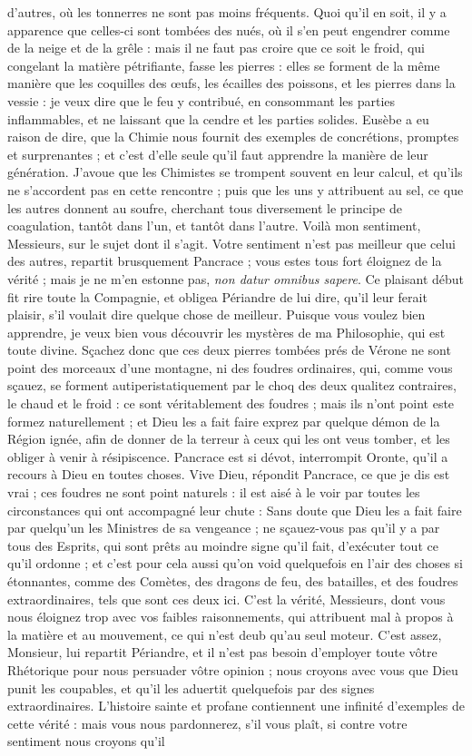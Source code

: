\documentclass[a4paper, 11pt, oneside, polutonikogreek, french, landscape, twocolumn]{article}
\begin{document}
d'autres, où les tonnerres ne sont pas moins fréquents. Quoi qu'il en soit, il y a apparence que celles-ci sont tombées des nués, où il s'en peut engendrer comme de la neige et de la grêle : mais il ne faut pas croire que ce soit le froid, qui congelant la matière pétrifiante, fasse les pierres : elles se forment de la même manière que les coquilles des œufs, les écailles des poissons, et les pierres dans la vessie : je veux dire que le feu y contribué, en consommant les parties inflammables, et ne laissant que la cendre et les parties solides. Eusèbe a eu raison de dire, que la Chimie nous fournit des exemples de concrétions, promptes et surprenantes ; et c'est d'elle seule qu'il faut apprendre la manière de leur génération. J'avoue que les Chimistes se trompent souvent en leur calcul, et qu'ils ne s'accordent pas en cette rencontre ; puis que les uns y attribuent au sel, ce que les autres donnent au soufre, cherchant tous diversement le principe de coagulation, tantôt dans l'un, et tantôt dans l'autre. Voilà mon sentiment, Messieurs, sur le sujet dont il s'agit. Votre sentiment n'est pas meilleur que celui des autres, repartit brusquement Pancrace ; vous estes tous fort éloignez de la vérité ; mais je ne m'en estonne pas, \emph{non datur omnibus sapere}. Ce plaisant début fit rire toute la Compagnie, et obligea Périandre de lui dire, qu'il leur ferait plaisir, s'il voulait dire quelque chose de meilleur. Puisque vous voulez bien apprendre, je veux bien vous découvrir les mystères de ma Philosophie, qui est toute divine. Sçachez donc que ces deux pierres tombées prés de Vérone ne sont point des morceaux d'une montagne, ni des foudres ordinaires, qui, comme vous sçauez, se forment autiperistatiquement par le choq des deux qualitez contraires, le chaud et le froid : ce sont véritablement des foudres ; mais ils n'ont point este formez naturellement ; et Dieu les a fait faire exprez par quelque démon de la Région ignée, afin de donner de la terreur à ceux qui les ont veus tomber, et les obliger à venir à résipiscence. Pancrace est si dévot, interrompit Oronte, qu'il a recours à Dieu en toutes choses. Vive Dieu, répondit Pancrace, ce que je dis est vrai ; ces foudres ne sont point naturels : il est aisé à le voir par toutes les circonstances qui ont accompagné leur chute : Sans doute que Dieu les a fait faire par quelqu'un les Ministres de sa vengeance ; ne sçauez-vous pas qu'il y a par tous des Esprits, qui sont prêts au moindre signe qu'il fait, d'exécuter tout ce qu'il ordonne ; et c'est pour cela aussi qu'on void quelquefois en l'air des choses si étonnantes, comme des Comètes, des dragons de feu, des batailles, et des foudres extraordinaires, tels que sont ces deux ici. C'est la vérité, Messieurs, dont vous nous éloignez trop avec vos faibles raisonnements, qui attribuent mal à propos à la matière et au mouvement, ce qui n'est deub qu'au seul moteur. C'est assez, Monsieur, lui repartit Périandre, et il n'est pas besoin d'employer toute vôtre Rhétorique pour nous persuader vôtre opinion ; nous croyons avec vous que Dieu punit les coupables, et qu'il les aduertit quelquefois par des signes extraordinaires. L'histoire sainte et profane contiennent une infinité d'exemples de cette vérité : mais vous nous pardonnerez, s'il vous plaît, si contre votre sentiment nous croyons qu'il 
\end{document}
